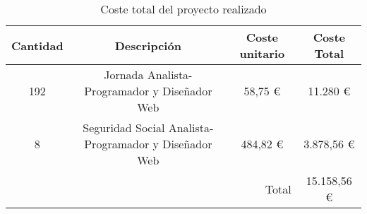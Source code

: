 \begin{table}[H]
  \begin{center}
    \begin{tabular}{| c | c | c | c |}
      \hline
      Cantidad & Descripción & Coste unitario & Coste Total\\ \hline
      192 & Jornada Analista-Programador y Diseñador Web & 58,75 \euro &
      11.280 \euro\\ \hline
      8 & Seguridad Social Analista-Programador y Diseñador Web & 484,82
      \euro & 3.878,56 \euro \\ \hline
      \multicolumn{3}{|r|}{Total} &  15.158,56 \euro\\
      \hline
    \end{tabular}
  \end{center}
  \caption{Coste total del proyecto realizado}
  \label{tab:coste}
\end{table}